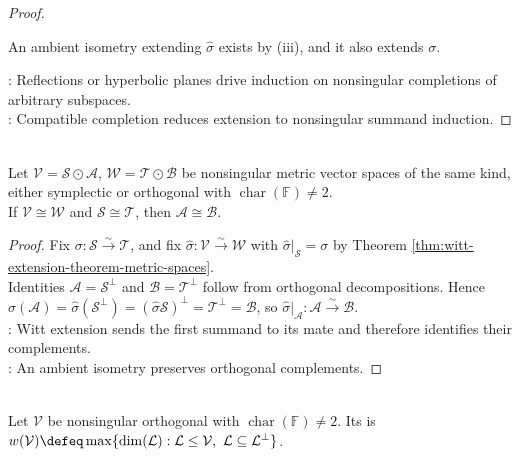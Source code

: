 \begin{theorem}
\begin{proof}
\begin{enumerate}[label=(\roman*)]
An ambient isometry extending $\widehat{\sigma}$ exists by (iii), and it also extends $\sigma$.
\end{enumerate}
: Reflections or hyperbolic planes drive induction on nonsingular completions of arbitrary subspaces.\\
: Compatible completion reduces extension to nonsingular summand induction.
\end{proof}
\end{theorem}

\begin{corollary} \label{cor:witt-cancellation-metric-spaces} \\
Let $\mathcal{V}=\mathcal{S}\odot\mathcal{A}$, $\mathcal{W}=\mathcal{T}\odot\mathcal{B}$ be nonsingular metric vector spaces of the same kind, either symplectic or orthogonal with $\operatorname{char}(\mathbb{F})\neq2$.\\
If $\mathcal{V}\cong\mathcal{W}$ and $\mathcal{S}\cong\mathcal{T}$, then $\mathcal{A}\cong\mathcal{B}$.
\begin{proof}
Fix $\sigma:\mathcal{S}\xrightarrow{\sim}\mathcal{T}$, and fix $\widehat{\sigma}:\mathcal{V}\xrightarrow{\sim}\mathcal{W}$ with $\widehat{\sigma}|_{\mathcal{S}}=\sigma$ by Theorem \ref{thm:witt-extension-theorem-metric-spaces}.\\
Identities $\mathcal{A}=\mathcal{S}^{\perp}$ and $\mathcal{B}=\mathcal{T}^{\perp}$ follow from orthogonal decompositions. Hence $\widehat{\sigma}(\mathcal{A})=\widehat{\sigma}(\mathcal{S}^{\perp})=(\widehat{\sigma}\mathcal{S})^{\perp}=\mathcal{T}^{\perp}=\mathcal{B}$, so $\widehat{\sigma}|_{\mathcal{A}}:\mathcal{A}\xrightarrow{\sim}\mathcal{B}$.\\
: Witt extension sends the first summand to its mate and therefore identifies their complements.\\
: An ambient isometry preserves orthogonal complements.
\end{proof}
\end{corollary}

\begin{definition} \label{def:orthogonal-witt-index} \\
Let $\mathcal{V}$ be nonsingular orthogonal with $\operatorname{char}(\mathbb{F})\neq2$. Its  is $w(\mathcal{V})\defeq\max\limits\{\dim(\mathcal{L}):\mathcal{L}\leq\mathcal{V},\ \mathcal{L}\subseteq\mathcal{L}^{\perp}\}$.
\end{definition}

